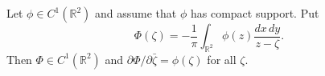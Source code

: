 
Let $\phi \in C^1(\mathbb{R}^2)$ and assume that $\phi$ has compact support. Put
$$\Phi(\zeta) = -\frac{1}{\pi} \int_{\mathbb{R}^2} \phi(z) \frac{dx\,dy}{z - \zeta}.$$
Then $\Phi \in C^1(\mathbb{R}^2)$ and $\partial \Phi / \partial \bar{\zeta} = \phi(\zeta)$ for all $\zeta$.
